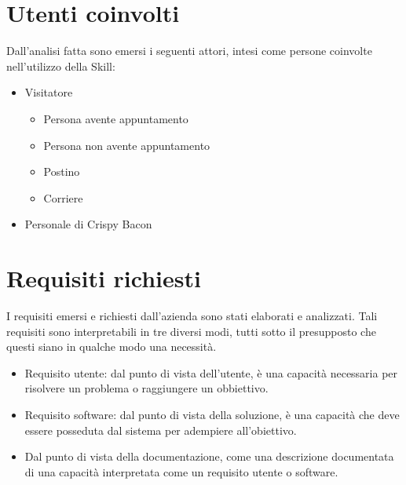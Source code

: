 \section{Utenti coinvolti}
Dall'analisi fatta sono emersi i seguenti attori, intesi come persone coinvolte nell'utilizzo della Skill:
\begin{itemize}
    \item Visitatore
        \begin{itemize}
            \item Persona avente appuntamento
            \item Persona non avente appuntamento
            \item Postino
            \item Corriere
        \end{itemize}
    \item Personale di Crispy Bacon
\end{itemize}

\section{Requisiti richiesti}
I requisiti emersi e richiesti dall'azienda sono stati elaborati e analizzati. Tali requisiti sono interpretabili in tre diversi modi, tutti sotto il presupposto che questi siano in qualche modo una necessità.
\begin{itemize}
    \item Requisito utente: dal punto di vista dell'utente, è una capacità necessaria per risolvere un problema o raggiungere un obbiettivo.
    \item Requisito software: dal punto di vista della soluzione, è una capacità che deve essere posseduta dal sistema per adempiere all'obiettivo.
    \item Dal punto di vista della documentazione, come una descrizione documentata di una capacità interpretata come un requisito utente o software.
\end{itemize}
